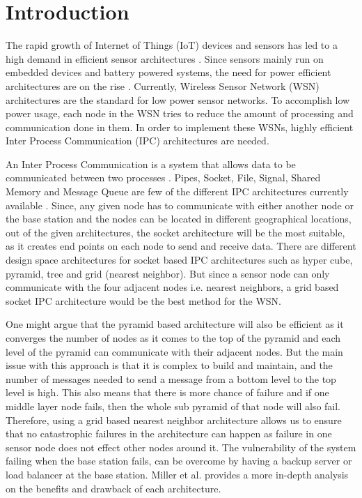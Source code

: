 \documentclass[conference]{IEEEtran}
\begin{document}
	\section{Introduction} \label{intro}
	
	The rapid growth of Internet of Things (IoT) devices and sensors has led to a high demand in efficient sensor architectures \cite{othman2012wireless}. Since sensors mainly run on embedded devices and battery powered systems, the need for power efficient architectures are on the rise \cite{guy2006wireless}. Currently, Wireless Sensor Network (WSN) architectures are the standard for low power sensor networks. To accomplish low power usage, each node in the WSN tries to reduce the amount of processing and communication done in them. In order to implement these WSNs, highly efficient Inter Process Communication (IPC) architectures are needed.
	
	An Inter Process Communication is a system that allows data to be communicated between two processes \cite{techopedia.com}. Pipes, Socket, File, Signal, Shared Memory and Message Queue are few of the different IPC architectures currently available \cite{onsman_2018}. Since, any given node has to communicate with either another node or the base station and the nodes can be located in different geographical locations, out of the given architectures, the socket architecture will be the most suitable, as it creates end points on each node to send and receive data. There are different design space architectures for socket based IPC architectures such as hyper cube, pyramid, tree and grid (nearest neighbor). But since a sensor node can only communicate with the four adjacent nodes i.e. nearest neighbors, a grid based socket IPC architecture would be the best method for the WSN. 
	
	One might argue that the pyramid based architecture will also be efficient as it converges the number of nodes as it comes to the top of the pyramid and each level of the pyramid can communicate with their adjacent nodes. But the main issue with this approach is that it is complex to build and maintain, and the number of messages needed to send a message from a bottom level to the top level is high. This also means that there is more chance of failure and if one middle layer node fails, then the whole sub pyramid of that node will also fail. Therefore, using a grid based nearest neighbor architecture allows us to ensure that no catastrophic failures in the architecture can happen as failure in one sensor node does not effect other nodes around it. The vulnerability of the system failing  when the base station fails, can be overcome by having a backup server or load balancer at the base station. Miller et al. \cite{miller1996parallel} provides a more in-depth analysis on the benefits and drawback of each architecture.
	
\end{document}
